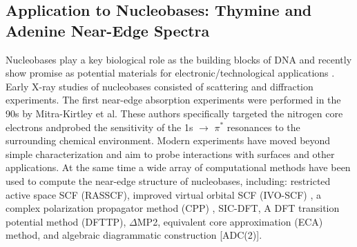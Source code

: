 \documentclass[8.5pt,twoside,twocolumn]{article}
\begin{document}
\subsection{Application to Nucleobases: Thymine and Adenine Near-Edge Spectra}
Nucleobases play a key biological role as the building blocks of DNA and recently show promise as potential materials for electronic/technological applications \cite{di_mauro_dna_1993,niemeyer_dna_1997,niemeyer_nanoparticles_2001,song_nucleobase_2012}. Early X-ray studies of nucleobases consisted of scattering and diffraction experiments.\cite{langridge_x-ray_1964,sundaralingam_structure_1975,camerman_photodimer_1968,davies_x-ray_1967} The first near-edge absorption experiments were performed in the 90s by Mitra-Kirtley et al.\cite{kirtley_nitrogen_1992} These authors specifically targeted the nitrogen  core electrons andprobed the sensitivity of the 1s $\rightarrow$ $\pi^*$ resonances to the surrounding chemical environment. Modern experiments have moved beyond simple characterization and aim to probe interactions with surfaces and other applications.\cite{seifert_molecular_2007,yamada_adsorption_2004,fujii_x-ray_2003,fujii_near-edge_2004}  At the same time a wide array of computational methods have been used to compute the near-edge structure of nucleobases, including: restricted active space SCF (RASSCF),\cite{mochizuki_hf-stex_2001} improved virtual orbital SCF (IVO-SCF) \cite{macnaughton_electronic_2005}, a complex polarization propagator method (CPP) \cite{ekstrom_polarization_2006}, SIC-DFT,\cite{bolognesi_investigation_2009} A DFT transition potential method (DFTTP), \cite{macnaughton_electronic_2005} $\Delta$MP2,\cite{shim_calibration_2011} equivalent core approximation (ECA) method,\cite{healion_probing_2008} and algebraic diagrammatic construction [ADC(2)].\cite{plekan_theoretical_2008,wenzel_calculating_2014}
  
\end{document}

